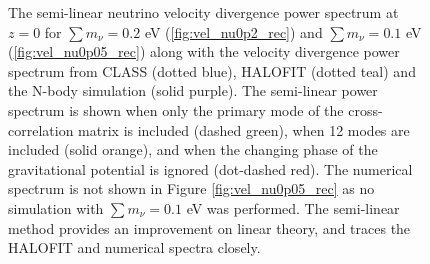 \documentclass[twocolumn,superscriptaddress,prd]{revtex4}
\newcommand{\halofit}{HALOFIT }
\begin{document}
\begin{figure}[h!]
  \centering
  \caption{The semi-linear neutrino velocity divergence power
      spectrum at $z=0$ for
     $\textstyle\sum m_\nu = 0.2$ eV (\ref{fig:vel_nu0p2_rec}) and $\textstyle\sum
     m_\nu = 0.1$ eV (\ref{fig:vel_nu0p05_rec}) along with the
     velocity  divergence
      power spectrum from CLASS (dotted blue), \halofit (dotted teal) and the N-body
      simulation (solid purple).  The semi-linear power spectrum is
      shown when only the primary mode of the
      cross-correlation matrix is included (dashed green), 
      when 12 modes are included (solid orange), and when the
      changing phase of the gravitational potential is ignored
      (dot-dashed red).  The numerical spectrum is not shown in Figure
      \ref{fig:vel_nu0p05_rec} as no simulation with $\textstyle\sum
      m_\nu = 0.1$ eV was performed.  
      The semi-linear method provides
      an improvement on linear theory, and traces the \halofit and
      numerical spectra closely.  
}
    \label{fig:vel_nu_rec}
\end{figure}
\end{document}
